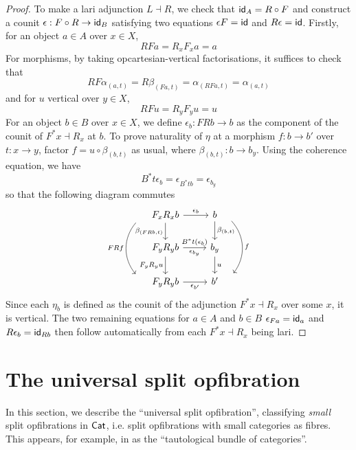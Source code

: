 \begin{proof}
  To make a lari adjunction $L \dashv R$,
  we check that $\mathsf{id}_A = R \circ F$ and construct a counit
  $\epsilon : F \circ R \to \mathsf{id}_B$ satisfying two equations
  $\epsilon F = \mathsf{id}$ and $R \epsilon = \mathsf{id}$.
  Firstly, for an object $a \in A$ over $x \in X$,
  \[R F a = R_x F_x a = a\]
  For morphisms, by taking opcartesian-vertical factorisations,
  it suffices to check that
  \[R F \alpha_{(a,t)} = R \beta_{(F a, t)} = \alpha_{(R F a,t)} = \alpha_{(a,t)}\]
  and for $u$ vertical over $y \in X$,
  \[R F u = R_y F_y u = u\]
  For an object $b \in B$ over $x \in X$,
  we define $\epsilon_b : F R b \to b$
  as the component of the counit of $F^* x \dashv R_x$ at $b$.
  To prove naturality of $\eta$ at a morphism
  $f : b \to b'$ over $t : x \to y$,
  factor $f = u \circ \beta_{(b,t)}$ as usual,
  where $\beta_{(b,t)} : b \to b_y$.
  Using the coherence equation, we have 
  \[B^* t \epsilon_b = \epsilon_{B^* t b} = \epsilon_{b_y}\]
  so that the following diagram commutes
  \[ \begin{tikzcd}
    {F_x R_x b} & b \\
    {F_y R_y b} & {b_y} \\
    {F_y R_y b} & {b'}
    \arrow["{\epsilon_{b}}", from=1-1, to=1-2]
    \arrow["{\beta_{(F R b,t)}}"', from=1-1, to=2-1]
    \arrow["{F R f}"', shift right=10, bend right = 40, from=1-1, to=3-1]
    \arrow["{\beta_{(b,t)}}", from=1-2, to=2-2]
    \arrow["f", shift left=5, bend left = 40, from=1-2, to=3-2]
    \arrow["{\epsilon_{b_y}}"', from=2-1, to=2-2]
    \arrow["{B^* t (\epsilon_b)}", draw=none, from=2-1, to=2-2]
    \arrow["{F_y R_y u}"', from=2-1, to=3-1]
    \arrow["u", from=2-2, to=3-2]
    \arrow["{\epsilon_{b'}}"', from=3-1, to=3-2]
  \end{tikzcd} \]
  Since each $\eta_b$ is defined as the counit of
  the adjunction $F^* x \dashv R_x$ over some $x$,
  it is vertical.
  The two remaining equations for $a \in A$ and $b \in B$ 
  $\epsilon_{F a} = \mathsf{id}_a$ and $R \epsilon_b = \mathsf{id}_{R b}$
  then follow automatically
  from each $F^* x \dashv R_x$ being lari.
\end{proof}

\section*{The universal split opfibration}

In this section, we describe the ``universal split opfibration'',
classifying \emph{small} split opfibrations in $\mathsf{Cat}$,
i.e. split opfibrations with small categories as fibres.
This appears, for example, in \cite{hess2007}
as the ``tautological bundle of categories''.

